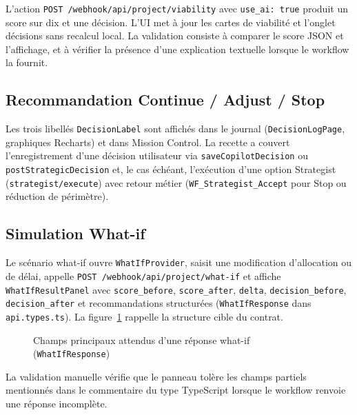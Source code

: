 L'action \texttt{POST /webhook/api/project/viability} avec \texttt{use\_ai: true} produit un score sur dix et une décision. L'UI met à jour les cartes de viabilité et l'onglet décisions sans recalcul local. La validation consiste à comparer le score JSON et l'affichage, et à vérifier la présence d'une explication textuelle lorsque le workflow la fournit.

\subsection{Recommandation Continue / Adjust / Stop}

Les trois libellés \texttt{DecisionLabel} sont affichés dans le journal (\texttt{DecisionLogPage}, graphiques Recharts) et dans Mission Control. La recette a couvert l'enregistrement d'une décision utilisateur via \texttt{saveCopilotDecision} ou \texttt{postStrategicDecision} et, le cas échéant, l'exécution d'une option Strategist (\texttt{strategist/execute}) avec retour métier (\texttt{WF\_Strategist\_Accept} pour Stop ou réduction de périmètre).

\subsection{Simulation What-if}

Le scénario what-if ouvre \texttt{WhatIfProvider}, saisit une modification d'allocation ou de délai, appelle \texttt{POST /webhook/api/project/what-if} et affiche \texttt{WhatIfResultPanel} avec \texttt{score\_before}, \texttt{score\_after}, \texttt{delta}, \texttt{decision\_before}, \texttt{decision\_after} et recommandations structurées (\texttt{WhatIfResponse} dans \texttt{api.types.ts}). La figure~\ref{fig:whatif-json-ch6} rappelle la structure cible du contrat.

\begin{figure}[htbp]
\centering
{}
\caption{Champs principaux attendus d'une réponse what-if (\texttt{WhatIfResponse})}
\label{fig:whatif-json-ch6}
\end{figure}

La validation manuelle vérifie que le panneau tolère les champs partiels mentionnés dans le commentaire du type TypeScript lorsque le workflow renvoie une réponse incomplète.

